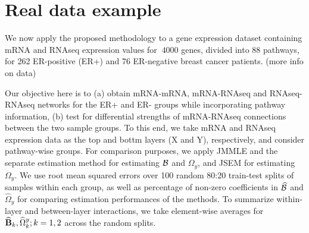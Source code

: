 \section{Real data example}
We now apply the proposed methodology to a gene expression dataset containing mRNA and RNAseq expression values for $~4000$ genes, divided into 88 pathways, for 262 ER-positive (ER+) and 76 ER-negative breast cancer patients. (more info on data)

Our objective here is to (a) obtain mRNA-mRNA, mRNA-RNAseq and RNAseq-RNAseq networks for the ER+ and ER- groups while incorporating pathway information, (b) test for differential strengths of mRNA-RNAseq connections between the two sample groups. To this end, we take mRNA and RNAseq expression data as the top and bottm layers (X and Y), respectively, and consider pathway-wise groups. For comparison purposes, we apply JMMLE and the separate estimation method \citet{LinEtal16} for estimating ${\cal{B}}$ and $\Omega_y$, and JSEM for estimating $\Omega_y$. We use root mean squared errors over 100 random 80:20 train-test splits of samples within each group, as well as percentage of non-zero coefficients in $\widehat {{\cal{B}}}$ and $\widehat \Omega_y$ for comparing estimation performances of the methods. To summarize within-layer and between-layer interactions, we take element-wise averages for $\widehat {{\mathbf{B}}}_k, \widehat \Omega^y_k; k= 1,2$ across the random splits.